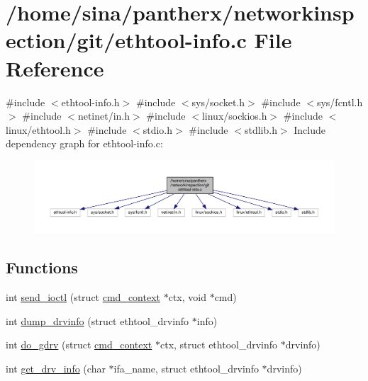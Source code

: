 \hypertarget{ethtool-info_8c}{}\section{/home/sina/pantherx/networkinspection/git/ethtool-\/info.c File Reference}
\label{ethtool-info_8c}
{\ttfamily \#include $<$ethtool-\/info.\+h$>$}\newline
{\ttfamily \#include $<$sys/socket.\+h$>$}\newline
{\ttfamily \#include $<$sys/fcntl.\+h$>$}\newline
{\ttfamily \#include $<$netinet/in.\+h$>$}\newline
{\ttfamily \#include $<$linux/sockios.\+h$>$}\newline
{\ttfamily \#include $<$linux/ethtool.\+h$>$}\newline
{\ttfamily \#include $<$stdio.\+h$>$}\newline
{\ttfamily \#include $<$stdlib.\+h$>$}\newline
Include dependency graph for ethtool-\/info.c\+:\nopagebreak
\begin{figure}[H]
\begin{center}
\leavevmode
\includegraphics[width=350pt]{ethtool-info_8c__incl}
\end{center}
\end{figure}
\subsection*{Functions}
\begin{DoxyCompactItemize}
\item 
int \hyperlink{ethtool-info_8c_a6d58a8ebd8093edbe407365d8f3e93e5}{send\+\_\+ioctl} (struct \hyperlink{structcmd__context}{cmd\+\_\+context} $\ast$ctx, void $\ast$cmd)
\item 
int \hyperlink{ethtool-info_8c_a972c7feb6f25da37144ec7933d787147}{dump\+\_\+drvinfo} (struct ethtool\+\_\+drvinfo $\ast$info)
\item 
int \hyperlink{ethtool-info_8c_a92defcf2493dee90aeaac81e3b15572c}{do\+\_\+gdrv} (struct \hyperlink{structcmd__context}{cmd\+\_\+context} $\ast$ctx, struct ethtool\+\_\+drvinfo $\ast$drvinfo)
\item 
int \hyperlink{ethtool-info_8c_af4d8c485fa8cc199f6e1f27e949c9dc4}{get\+\_\+drv\+\_\+info} (char $\ast$ifa\+\_\+name, struct ethtool\+\_\+drvinfo $\ast$drvinfo)
\end{DoxyCompactItemize}


